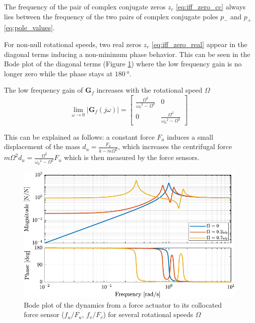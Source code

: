 \documentclass[Afour,sagev,times]{sagej}
\begin{document}
The frequency of the pair of complex conjugate zeros \(z_c\) \eqref{eq:iff_zero_cc} always lies between the frequency of the two pairs of complex conjugate poles \(p_{-}\) and \(p_{+}\) \eqref{eq:pole_values}.

For non-null rotational speeds, two real zeros \(z_r\) \eqref{eq:iff_zero_real} appear in the diagonal terms inducing a non-minimum phase behavior.
This can be seen in the Bode plot of the diagonal terms (Figure \ref{fig:plant_iff_compare_rotating_speed}) where the low frequency gain is no longer zero while the phase stays at \(\SI{180}{\degree}\).

The low frequency gain of \(\bm{G}_f\) increases with the rotational speed \(\Omega\)
\begin{equation}
\label{eq:low_freq_gain_iff_plan}
  \lim_{\omega \to 0} \left| \bm{G}_f (j\omega) \right| = \begin{bmatrix}
  \frac{\Omega^2}{{\omega_0}^2 - \Omega^2} & 0 \\
  0  & \frac{\Omega^2}{{\omega_0}^2 - \Omega^2}
\end{bmatrix}
\end{equation}

This can be explained as follows: a constant force \(F_u\) induces a small displacement of the mass \(d_u = \frac{F_u}{k - m\Omega^2}\), which increases the centrifugal force \(m\Omega^2d_u = \frac{\Omega^2}{{\omega_0}^2 - \Omega^2} F_u\) which is then measured by the force sensors.

\begin{figure}[htbp]
\centering
\includegraphics[width=\linewidth]{figs/plant_iff_compare_rotating_speed.pdf}
\caption{\label{fig:plant_iff_compare_rotating_speed}Bode plot of the dynamics from a force actuator to its collocated force sensor (\(f_u/F_u\), \(f_v/F_v\)) for several rotational speeds \(\Omega\)}
\end{figure}
\end{document}
